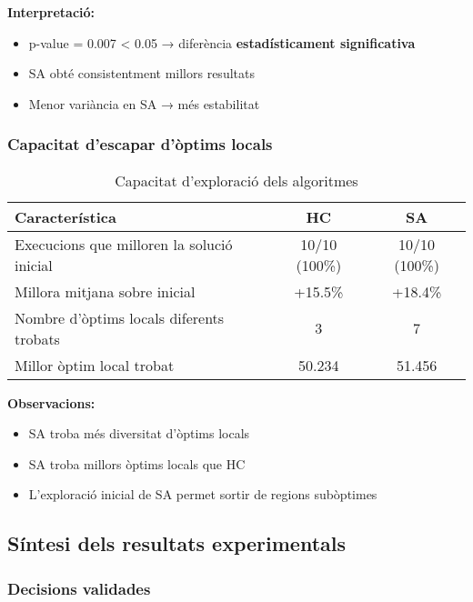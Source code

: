 \textbf{Interpretació:}
\begin{itemize}
    \item p-value = 0.007 < 0.05 → diferència \textbf{estadísticament significativa}
    \item SA obté consistentment millors resultats
    \item Menor variància en SA → més estabilitat
\end{itemize}

\subsubsection{Capacitat d'escapar d'òptims locals}

\begin{table}[H]
\centering
\begin{tabular}{@{}lcc@{}}
\toprule
\textbf{Característica} & \textbf{HC} & \textbf{SA} \\
\midrule
Execucions que milloren la solució inicial & 10/10 (100\%) & 10/10 (100\%) \\
Millora mitjana sobre inicial & +15.5\% & +18.4\% \\
Nombre d'òptims locals diferents trobats & 3 & 7 \\
Millor òptim local trobat & 50.234 & 51.456 \\
\bottomrule
\end{tabular}
\caption{Capacitat d'exploració dels algoritmes}
\label{tab:optims-locals}
\end{table}

\textbf{Observacions:}
\begin{itemize}
    \item SA troba més diversitat d'òptims locals
    \item SA troba millors òptims locals que HC
    \item L'exploració inicial de SA permet sortir de regions subòptimes
\end{itemize}

\subsection{Síntesi dels resultats experimentals}

\subsubsection{Decisions validades}

